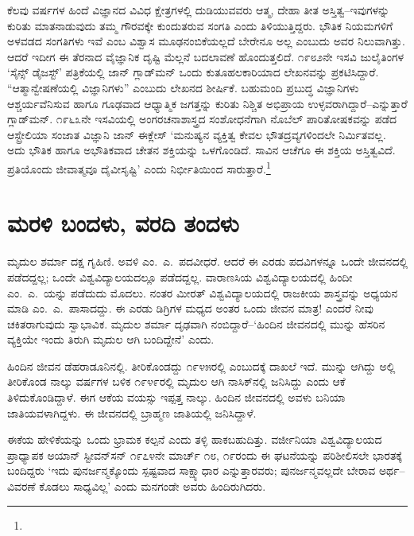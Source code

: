 ಕೆಲವು ವರ್ಷಗಳ ಹಿಂದೆ ವಿಜ್ಞಾನದ ವಿವಿಧ ಕ್ಷೇತ್ರಗಳಲ್ಲಿ ದುಡಿಯುವವರು ಆತ್ಮ, ದೇಹಾ ತೀತ ಅಸ್ತಿತ್ವ–ಇವುಗಳನ್ನು ಕುರಿತು ಮಾತನಾಡುವುದು ತಮ್ಮ ಗೌರವಕ್ಕೇ ಕುಂದುತರುವ ಸಂಗತಿ ಎಂದು ತಿಳಿಯುತ್ತಿದ್ದರು. ಭೌತಿಕ ನಿಯಮಗಳಿಗೆ ಅಳವಡದ ಸಂಗತಿಗಳು ಇವೆ ಎಂಬ ವಿಶ್ವಾಸ ಮೂಢನಂಬಿಕೆಯಲ್ಲದೆ ಬೇರೇನೂ ಅಲ್ಲ ಎಂಬುದು ಅವರ ನಿಲುವಾಗಿತ್ತು. ಆದರೆ ಇದೀಗ ಈ ತೆರನಾದ ವೈಜ್ಞಾನಿಕ ದೃಷ್ಟಿ ಮೆಲ್ಲನೆ ಬದಲಾವಣೆ ಹೊಂದುತ್ತಲಿದೆ. ೧೯೮೨ನೇ ಇಸವಿ ಜುಲೈ\break ತಿಂಗಳ ‘ಸೈನ್ಸ್ ಡೈಜಸ್ಟ್​’ ಪತ್ರಿಕೆಯಲ್ಲಿ ಜಾನ್ ಗ್ಲಾಡ್​ಮನ್ ಒಂದು ಕುತೂಹಲಕಾರಿಯಾದ ಲೇಖನವನ್ನು ಪ್ರಕಟಿಸಿದ್ದಾರೆ. “ಆತ್ಮಾನ್ವೇಷಣೆಯಲ್ಲಿ ವಿಜ್ಞಾನಿಗಳು” ಎಂಬುದು ಲೇಖನದ ಶೀರ್ಷಿಕೆ. ಬಹುಮಂದಿ ಪ್ರಬುದ್ಧ ವಿಜ್ಞಾನಿಗಳು ಆಶ್ಚರ್ಯವೆನಿಸುವ ಹಾಗೂ ಗೂಢವಾದ ಆಧ್ಯಾತ್ಮಿಕ ಜಗತ್ತನ್ನು ಕುರಿತು ನಿಶ್ಚಿತ ಅಭಿಪ್ರಾಯ ಉಳ್ಳವರಾಗಿದ್ದಾರೆ–ಎನ್ನುತ್ತಾರೆ ಗ್ಲಾಡ್​ಮನ್. ೧೯೬೩ನೇ ಇಸವಿಯಲ್ಲಿ ಅಂಗರಚನಾಶಾಸ್ತ್ರದ ಸಂಶೋಧನೆಗಾಗಿ ನೊಬೆಲ್ ಪಾರಿತೋಷಕವನ್ನು ಪಡೆದ ಆಸ್ಟ್ರೇಲಿಯಾ ಸಂಜಾತ ವಿಜ್ಞಾನಿ ಜಾನ್ ಈಕ್ಲೇಸ್ ‘ಮನುಷ್ಯನ ವ್ಯಕ್ತಿತ್ವ ಕೇವಲ ಭೌತದ್ರವ್ಯಗಳಿಂದಲೇ ನಿರ್ಮಿತವಲ್ಲ. ಅದು ಭೌತಿಕ ಹಾಗೂ ಅಭೌತಿಕವಾದ ಚೇತನ ಶಕ್ತಿಯನ್ನು ಒಳಗೊಂಡಿದೆ. ಸಾವಿನ ಆಚೆಗೂ ಈ ಶಕ್ತಿಯ ಅಸ್ತಿತ್ವವಿದೆ. ಪ್ರತಿಯೊಂದು ಜೀವಾತ್ಮವೂ ದೈವೀಸೃಷ್ಟಿ’ ಎಂದು ನಿರ್ಭೀತಿಯಿಂದ ಸಾರುತ್ತಾರೆ.\footnote{}


\section*{ಮರಳಿ ಬಂದಳು, ವರದಿ ತಂದಳು}


ಮೃದುಲ ಶರ್ಮಾ ದಕ್ಷ ಗೃಹಿಣಿ. ಅವಳಿ ಎಂ.\ ಎ.\ ಪದವೀಧರೆ. ಆದರೆ ಈ ಎರಡು ಪದವಿಗಳನ್ನೂ ಒಂದೇ ಜೀವನದಲ್ಲಿ ಪಡೆದದ್ದಲ್ಲ; ಒಂದೇ ವಿಶ್ವವಿದ್ಯಾಲಯದಲ್ಲೂ ಪಡೆದದ್ದಲ್ಲ. ವಾರಾಣಸಿಯ ವಿಶ್ವವಿದ್ಯಾಲಯದಲ್ಲಿ ಹಿಂದೀ ಎಂ.\ ಎ.\ ಯನ್ನು ಪಡೆದುದು ಮೊದಲು. ನಂತರ ಮೀರತ್ ವಿಶ್ವವಿದ್ಯಾಲಯದಲ್ಲಿ ರಾಜಕೀಯ ಶಾಸ್ತ್ರವನ್ನು ಅಧ್ಯಯನ ಮಾಡಿ ಎಂ.\ ಎ.\ ಪಾಸಾದದ್ದು. ಈ ಎರಡು ಡಿಗ್ರಿಗಳ ಮಧ್ಯದ ಅಂತರ ಒಂದು ಜೀವನ ಮಾತ್ರ! ಎಂದರೆ ನೀವು ಚಕಿತರಾಗುವುದು ಸ್ವಾಭಾವಿಕ. ಮೃದುಲ ಶರ್ಮಾ ದೃಢವಾಗಿ ನಂಬಿದ್ದಾರೆ–‘ಹಿಂದಿನ ಜೀವನದಲ್ಲಿ ಮುನ್ನು ಹೆಸರಿನ ವ್ಯಕ್ತಿಯೇ ಇಂದು ತಿರುಗಿ ಮೃದುಲ ಆಗಿ ಬಂದಿದ್ದೇನೆ’ ಎಂದು.

ಹಿಂದಿನ ಜೀವನ ಡೆಹರಾಡೂನಿನಲ್ಲಿ. ತೀರಿಕೊಂಡದ್ದು ೧೯೪೫ರಲ್ಲಿ ಎಂಬುದಕ್ಕೆ ದಾಖಲೆ ಇದೆ. ಮುನ್ನು ಆಗಿದ್ದು ಅಲ್ಲಿ ತೀರಿಕೊಂಡ ನಾಲ್ಕು ವರ್ಷಗಳ ಬಳಿಕ ೧೯೪೯ರಲ್ಲಿ ಮೃದುಲ ಆಗಿ ನಾಸಿಕ್​ನಲ್ಲಿ ಜನಿಸಿದ್ದು ಎಂದು ಆಕೆ ತಿಳಿದುಕೊಂಡಿದ್ದಾಳೆ. ಈಗ ಆಕೆಯ ವಯಸ್ಸು ಇಪ್ಪತ್ತ ನಾಲ್ಕು. ಹಿಂದಿನ ಜೀವನದಲ್ಲಿ ಅವಳು ಬನಿಯಾ ಜಾತಿಯವಳಾಗಿದ್ದಳು. ಈ ಜೀವನದಲ್ಲಿ ಬ್ರಾಹ್ಮಣ ಜಾತಿಯಲ್ಲಿ ಜನಿಸಿದ್ದಾಳೆ.

ಈಕೆಯ ಹೇಳಿಕೆಯನ್ನು ಒಂದು ಭ್ರಾಮಕ ಕಲ್ಪನೆ ಎಂದು ತಳ್ಳಿ ಹಾಕಬಹುದಿತ್ತು. ವರ್ಜೀನಿಯಾ ವಿಶ್ವವಿದ್ಯಾಲಯದ ಪ್ರಾಧ್ಯಾಪಕ ಅಯಾನ್ ಸ್ಟೀವನ್​ಸನ್ ೧೯೭೪ನೇ ಮಾರ್ಚ್ ೧೮, ೧೯ರಂದು ಈ ಘಟನೆಯನ್ನು ಪರಿಶೀಲಿಸಲೇ ಭಾರತಕ್ಕೆ ಬಂದಿದ್ದರು ‘ಇದು ಪುನರ್ಜನ್ಮಕ್ಕೊಂದು ಸ್ಪಷ್ಟವಾದ ಸಾಕ್ಷ್ಯಾಧಾರ ಎನ್ನುತ್ತಾರವರು; ಪುನರ್ಜನ್ಮವಲ್ಲದೇ ಬೇರಾವ ಅರ್ಥ– ವಿವರಣೆ ಕೊಡಲು ಸಾಧ್ಯವಿಲ್ಲ’ ಎಂದು ಮನಗಂಡೇ ಅವರು ಹಿಂದಿರುಗಿದರು.

